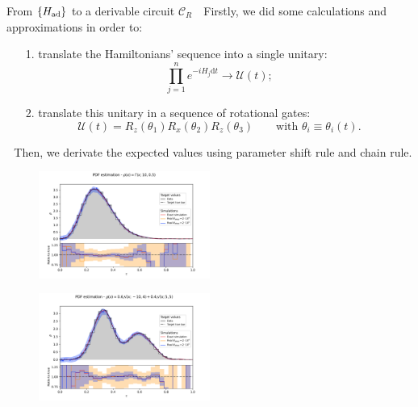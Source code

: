 \documentclass[8pt, xcolor={svgnames}, hyperref={colorlinks, linkcolor=black, citecolor=amethyst, urlcolor=amethyst}]{beamer}
\begin{document}
\begin{frame}{From $\{H_{\rm ad}\}$ to a derivable circuit $\mathcal{C}_R$ \hfill \faTerminal}
\faArrowCircleRight\,\, Firstly, we did some calculations and approximations in order to:
\pause
\begin{itemize}[noitemsep]
\item[1.] translate the Hamiltonians' sequence into a single unitary:
$$\prod_{j=1}^{n} e^{-i H_{j}\text{d}t} \to \mathcal{U}(t);$$
\pause 
\item[2.] translate this unitary in a sequence of rotational gates:
$$ \mathcal{U}(t) = R_z(\theta_1)R_x(\theta_2)R_z(\theta_3) \qquad \text{with}\,\, \theta_i \equiv \theta_i(t).$$
\end{itemize}
\pause 
\faArrowCircleRight\,\, Then, we derivate the expected values using parameter shift rule
and chain rule.
\pause 
\begin{multicols}{2}
\begin{figure}
    \includegraphics[width=0.5\textwidth]{figures/PDF_gamma_25_20_200000.pdf}
\end{figure}
\begin{figure}
    \includegraphics[width=0.5\textwidth]{figures/PDF_gauss_30_20_200000.pdf}
\end{figure}
\end{multicols}
\end{frame}
\end{document}
